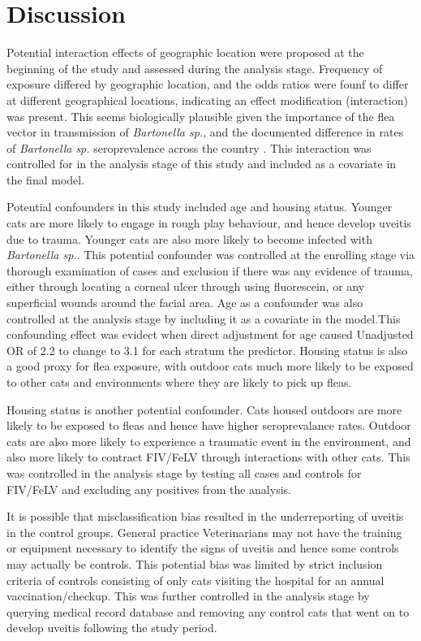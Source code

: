 \documentclass[11pt,twocolumn]{article}
\begin{document}
\section{Discussion}
		Potential interaction effects of geographic location were proposed at the beginning of the study and assessed during the analysis stage.
		Frequency of exposure differed by geographic location, and the odds ratios were founf to differ at different geographical locations, indicating an effect modification (interaction) was present.
		This seems biologically plausible given the importance of the flea vector in transmission of \emph{Bartonella sp.}, and the documented difference in rates of \emph{Bartonella sp.} seroprevalence across the country \cite{Jameson1995a}.
		This interaction was controlled for in the analysis stage of this study and included as a covariate in the final model.

		Potential confounders in this study included age and housing status. 
		Younger cats are more likely to engage in rough play behaviour, and hence develop uveitis due to trauma. Younger cats are also more likely to become infected with \emph{Bartonella sp.}.
		This potential confounder was controlled at the enrolling stage via thorough examination of cases and exclusion if there was any evidence of trauma, either through locating a corneal ulcer through using fluorescein, or any superficial wounds around the facial area.
		Age as a confounder was also controlled at the analysis stage by including it as a covariate in the model.This confounding effect was evidect when direct adjustment for age caused Unadjusted OR of 2.2 to change to 3.1 for each stratum the predictor.
		Housing status is also a good proxy for flea exposure, with outdoor cats much more likely to be exposed to other cats and environments where they are likely to pick up fleas.

		
		Housing status is another potential confounder. Cats housed outdoors are more likely to be exposed to fleas and hence have higher seroprevalance rates.
		Outdoor cats are also more likely to experience a traumatic event in the environment, and also more likely to contract FIV/FeLV through interactions with other cats.
		This was controlled in the analysis stage by testing all cases and controls for FIV/FeLV and excluding any positives from the analysis.


		It is possible that misclassification bias resulted in the underreporting of uveitis in the control groups. General practice Veterinarians may not have the training or equipment necessary to identify the signs of uveitis and hence some controls may actually be controls.
		This potential bias was limited by strict inclusion criteria of controls consisting of only cats visiting the hospital for an annual vaccination/checkup. 
		This was further controlled in the analysis stage by querying medical record database and removing any control cats that went on to develop uveitis following the study period.
\end{document}
